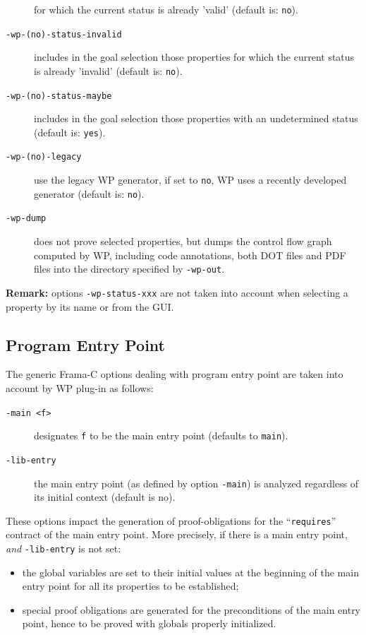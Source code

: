 \begin{description}
  for which the current status is already 'valid' (default is: \texttt{no}).
\item [\tt -wp-(no)-status-invalid] includes in the goal selection those properties
  for which the current status is already 'invalid' (default is: \texttt{no}).
\item [\tt -wp-(no)-status-maybe] includes in the goal selection those properties with
  an undetermined status (default is: \texttt{yes}).
\item [\tt -wp-(no)-legacy] use the legacy WP generator, if set to \texttt{no},
  WP uses a recently developed generator (default is: \texttt{no}).
\item [\tt -wp-dump] does not prove selected properties, but dumps the control
  flow graph computed by WP, including code annotations, both DOT files and PDF
  files into the directory specified by \texttt{-wp-out}.
\end{description}

\textbf{Remark:} options \texttt{-wp-status-xxx} are not taken into account
when selecting a property by its name or from the GUI.

\subsection{Program Entry Point}

The generic \textsf{Frama-C} options dealing with program entry point
are taken into account by \textsf{WP} plug-in as follows:

\begin{description}
\item [\tt -main <f>] designates \texttt{f} to be the main entry point (defaults to \texttt{main}).
\item [\tt -lib-entry] the main entry point (as defined by option
\texttt{-main}) is analyzed regardless of its initial context (default is no).
\end{description}

These options impact the generation of proof-obligations for the
``\texttt{requires}'' contract of the main entry point. More precisely, if there
is a main entry point, \emph{and} \texttt{-lib-entry} is not set:
\begin{itemize}
\item the global variables are set to their initial values at the
  beginning of the main entry point for all its properties to be established;
\item special proof obligations are generated for the preconditions of the
  main entry point, hence to be proved with globals properly initialized.
\end{itemize}

